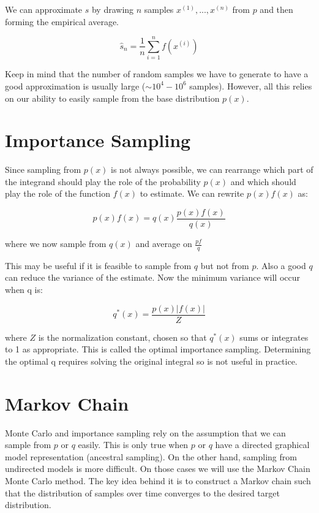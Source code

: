 \noindent We can approximate $s$ by drawing $n$ samples $x^{(1)} ,..., x^{(n)}$ from $p$ and then forming the empirical
average.

$$ \hat{s}_n = \frac{1}{n} \sum_{i=1}^{n} {f(x^{(i)})}  $$

\noindent Keep in mind that the number of random samples we have to generate to have a good approximation is usually large ($\sim 10^4 - 10^6$ samples). However, all this relies on our ability to easily sample from the base distribution $p(x)$.

\section{Importance Sampling}

Since sampling from $p(x)$ is not always possible, we can rearrange which part of the integrand should play the role of the probability $p(x)$ and which should play the role of the function $f(x)$ to estimate. We can rewrite $p(x)f(x)$ as:

$$ p(x) f(x) = q(x) \frac{p(x)f(x)}{q(x)} $$

where we now sample from $q(x)$ and average on $ \frac{pf}{q} $

\noindent This may be useful if it is feasible to sample from $q$ but not from $p$. Also a good $q$ can reduce the
variance of the estimate. Now the minimum variance will occur when q is:

$$ q^{*} (x) = \frac{p(x) |f(x)|}{Z}$$

where $Z$ is the normalization constant, chosen so that $q^{*} (x)$ sums or integrates to 1 as appropriate. This is called the optimal importance sampling. Determining the optimal q requires solving the original integral so is not useful in practice.

\newpage
\section{Markov Chain}

Monte Carlo and importance sampling rely on the assumption that we can sample from $p$ or $q$ easily. This is only true when $p$ or $q$ have a directed graphical model representation (ancestral sampling). On the other hand, sampling from undirected models is more difficult. On those cases we will use the Markov Chain Monte Carlo method. The key idea behind it is to construct a Markov chain such that the distribution of samples over time converges to the desired target distribution.

